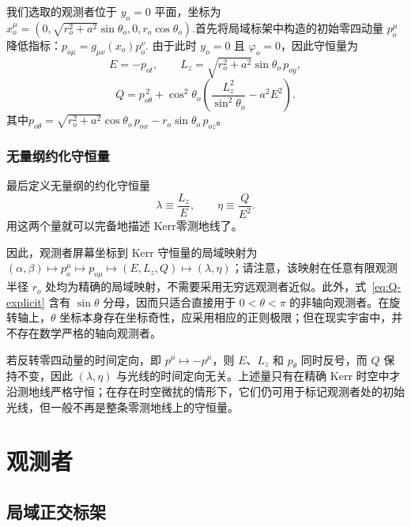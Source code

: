 \documentclass[UTF8,11pt,a4paper,fontset=fandol]{ctexart}
\begin{document}
我们选取的观测者位于 $y_o=0$ 平面，坐标为$x_o^\mu=\left(0,\sqrt{r_o^2+a^2}\sin\theta_o,0,r_o\cos\theta_o\right).$首先将局域标架中构造的初始零四动量 $p_o^\mu$ 降低指标：$p_{o\mu}=g_{\mu\nu}(x_o)p_o^\nu.$ 由于此时 $y_o=0$ 且 $\varphi_o=0$，因此守恒量为
\begin{equation}
    E=-p_{ot},\qquad
    L_z=\sqrt{r_o^2+a^2}\sin\theta_o\,p_{oy},
    \label{eq:observer-constants}
\end{equation}
\begin{equation}
    Q=p_{o\theta}^{\,2}
    +\cos^2\theta_o
    \left(\frac{L_z^2}{\sin^2\theta_o}-a^2E^2\right).
    \label{eq:observer-Q}
\end{equation}
其中$p_{o\theta}=\sqrt{r_o^2+a^2}\cos\theta_o\,p_{ox}-r_o\sin\theta_o\,p_{oz}$。

\subsubsection*{无量纲约化守恒量}
最后定义无量纲的约化守恒量
\begin{equation}
    \lambda\equiv\frac{L_z}{E},\qquad
    \eta\equiv\frac{Q}{E^2}.
    \label{eq:impact-parameters}
\end{equation}
用这两个量就可以完备地描述 Kerr零测地线了。

因此，观测者屏幕坐标到 Kerr 守恒量的局域映射为
$
    (\alpha,\beta)\longmapsto p_o^\mu
    \longmapsto p_{o\mu}
    \longmapsto(E,L_z,Q)
    \longmapsto(\lambda,\eta)
$；请注意，该映射在任意有限观测半径 $r_o$ 处均为精确的局域映射，不需要采用无穷远观测者近似。此外，式~\eqref{eq:Q-explicit} 含有 $\sin\theta$ 分母，因而只适合直接用于 $0<\theta<\pi$ 的非轴向观测者。在旋转轴上，$\theta$ 坐标本身存在坐标奇性，应采用相应的正则极限；但在现实宇宙中，并不存在数学严格的轴向观测者。

若反转零四动量的时间定向，即 $p^\mu\mapsto-p^\mu$，则 $E$、$L_z$ 和 $p_\theta$ 同时反号，而 $Q$ 保持不变，因此 $(\lambda,\eta)$ 与光线的时间定向无关。上述量只有在精确 Kerr 时空中才沿测地线严格守恒；在存在时空微扰的情形下，它们仍可用于标记观测者处的初始光线，但一般不再是整条零测地线上的守恒量。

\section{观测者}

\subsection{局域正交标架}
\end{document}
